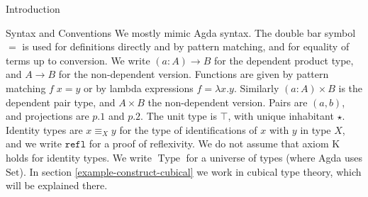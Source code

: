 \documentclass[runningheads]{llncs}
\newcommand{\todo}[1]{\textcolor{red}{TODO: {#1}}}
\newcommand{\erase}[1]{{}}
\DeclareMathOperator{\USet}{Type}
\DeclareMathOperator{\UU}{U}
\newcommand{\IdA}[3]{{#1}\equiv_{#3}{#2}}
\newcommand{\refl}{\texttt{refl}}
\begin{document}
\begin{section}{Introduction}
\erase{\todo{work on this} While Agda supports inductive-inductive types natively \citep{nordvallforsbergSetzer2010inductiveinductive}, Coq 8.8 does not. Constructing inductive-inductive types out of simpler types allows for a simpler core type theory without sacrificing expressiveness.}

\end{section}

\begin{subsection}{Syntax and Conventions}
    We mostly mimic Agda syntax. The double bar symbol $=$ is used for definitions directly and by pattern matching, and for equality of terms up to conversion. We write $(a : A) \to B$ for the dependent product type, and $A \to B$ for the non-dependent version. Functions are given by pattern matching $f\; x = y$ or by lambda expressions $f = \lambda x.y$. Similarly $(a : A) \times B$ is the dependent pair type, and $A \times B$ the non-dependent version. Pairs are $(a, b)$, and projections are $p.1$ and $p.2$. The unit type is $\top$, with unique inhabitant $\star$. Identity types are $\IdA{x}{y}{X}$ for the type of identifications of $x$ with $y$ in type $X$, and we write $\refl$ for a proof of reflexivity. We do not assume that axiom K holds for identity types.\erase{ We often use left-nested dependent pair types, or tuples $(\star : \top) \times (a : A) \times (b : B) \times C$. We will use $\langle a, b, c\rangle$ as a shorthand for $(((\star, a), b), c)$, and if there are names associated with the components, such as $A$, $B$, and $C$ above, we may use $\langle p.A, p.B, p.C\rangle$ for the projections.} We write $\USet$ for a universe of types (where Agda uses $\text{Set}$). In section \ref{example-construct-cubical} we work in cubical type theory, which will be explained there.
    
    \erase{ In section \ref{IIspecs-definition}, we define a syntactic extension of type theory, to write specifications of inductive-inductive types. There we use $\Pi$ to suggest dependent function types, $\Sigma$ to suggest dependent pair types, and $\UU$ to suggest a universe. However, these symbols will only be used in syntax for inductive-inductive specifications, and not to denote types. We reuse $\top$ and $\star$, as well as notations for lambda and pairing, letting context disambiguate. }
    

\end{subsection}
\end{document}
